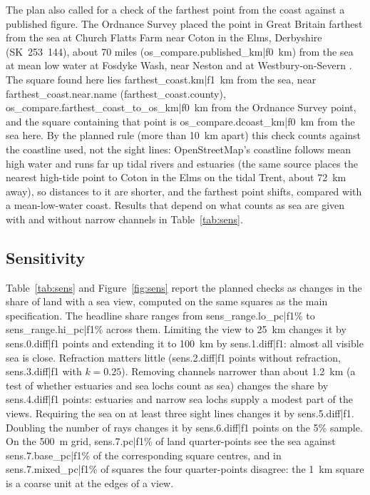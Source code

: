 The plan also called for a check of the farthest point from the coast against a published figure. The Ordnance Survey placed the point in Great Britain farthest from the sea at Church Flatts Farm near Coton in the Elms, Derbyshire (SK~253~144), about 70 miles ({{os_compare.published_km|f0}}~km) from the sea at mean low water at Fosdyke Wash, near Neston and at Westbury-on-Severn \citep{haran2003}. The square found here lies {{farthest_coast.km|f1}}~km from the sea, near {{farthest_coast.near.name}} ({{farthest_coast.county}}), {{os_compare.farthest_coast_to_os_km|f0}}~km from the Ordnance Survey point, and the square containing that point is {{os_compare.dcoast_km|f0}}~km from the sea here. By the planned rule (more than 10~km apart) this check counts against the coastline used, not the sight lines: OpenStreetMap's coastline follows mean high water and runs far up tidal rivers and estuaries (the same source places the nearest high-tide point to Coton in the Elms on the tidal Trent, about 72~km away), so distances to it are shorter, and the farthest point shifts, compared with a mean-low-water coast. Results that depend on what counts as sea are given with and without narrow channels in Table~\ref{tab:sens}.

\subsection{Sensitivity}
Table~\ref{tab:sens} and Figure~\ref{fig:sens} report the planned checks as changes in the share of land with a sea view, computed on the same squares as the main specification. The headline share ranges from {{sens_range.lo_pc|f1}}\% to {{sens_range.hi_pc|f1}}\% across them. Limiting the view to 25~km changes it by {{sens.0.diff|f1}} points and extending it to 100~km by {{sens.1.diff|f1}}: almost all visible sea is close. Refraction matters little ({{sens.2.diff|f1}} points without refraction, {{sens.3.diff|f1}} with $k=0.25$). Removing channels narrower than about 1.2~km (a test of whether estuaries and sea lochs count as sea) changes the share by {{sens.4.diff|f1}} points: estuaries and narrow sea lochs supply a modest part of the views. Requiring the sea on at least three sight lines changes it by {{sens.5.diff|f1}}. Doubling the number of rays changes it by {{sens.6.diff|f1}} points on the 5\% sample. On the 500~m grid, {{sens.7.pc|f1}}\% of land quarter-points see the sea against {{sens.7.base_pc|f1}}\% of the corresponding square centres, and in {{sens.7.mixed_pc|f1}}\% of squares the four quarter-points disagree: the 1~km square is a coarse unit at the edges of a view.

